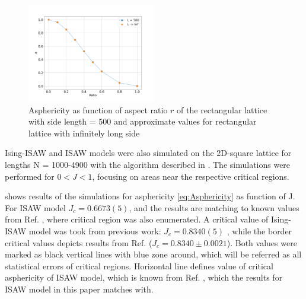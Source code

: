 \begin{figure}[h]
    \centering
    \includegraphics[width=0.5\textwidth]{Images/A_r.png}
    \caption{Asphericity as function of aspect ratio $r$ of the rectangular lattice with side length = 500 and approximate values for rectangular lattice with infinitely long side}
    \label{fig:A_r}
\end{figure}


Ising-ISAW and ISAW models were also simulated on the 2D-square lattice for lengths N = 1000-4900 with the algorithm described in \cite{faizullina2021critical}. 
The simulations were performed for $0 < J < 1$, focusing on areas near the respective critical regions.

 shows results of the simulations for asphericity \eqref{eq:Asphericity} as function of J. 
For ISAW model $J_{c} = 0.6673(5)$, and the results are matching to known values from  Ref. \cite{Caracciolo2011}, where critical region was also enumerated.
A critical value of Ising-ISAW model was took from previous work: $J_{c} = 0.8340(5)$ \cite{faizullina2021critical}, while the border critical values depicts results from Ref.\cite{Foster2021} ($J_{c} = 0.8340 \pm 0.0021$). 
Both values were marked as black vertical lines with blue zone around, which will be referred as all statistical errors of critical regions. 
Horizontal line defines value of critical asphericity of ISAW model, which is known from Ref. \cite{Caracciolo2011}, which the results for ISAW model in this paper matches with.

